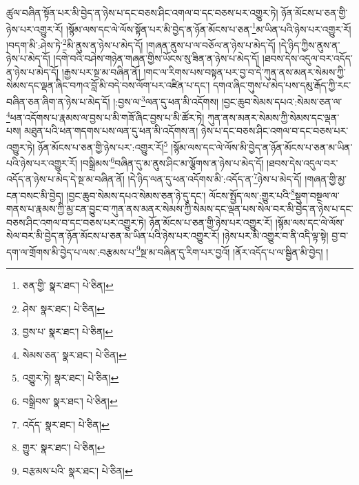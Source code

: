 ཚུལ་བཞིན་སྟོན་པར་མི་བྱེད་ན་ཉེས་པ་དང་བཅས་ཤིང་འགལ་བ་དང་བཅས་པར་འགྱུར་ཏེ། ཉོན་མོངས་པ་ཅན་གྱི་ཉེས་པར་འགྱུར་རོ། །སྙོམ་ལས་དང་ལེ་ལོས་སྟོན་པར་མི་བྱེད་ན་ཉོན་མོངས་པ་ཅན་\footnote{ཅན་གྱི་  སྣར་ཐང་།  པེ་ཅིན། }མ་ཡིན་པའི་ཉེས་པར་འགྱུར་རོ། །བདག་མི་:ཤེས་ཏེ་\footnote{ཤེས་  སྣར་ཐང་།  པེ་ཅིན། }མི་ནུས་ན་ཉེས་པ་མེད་དོ། །གཞན་ནུས་པ་ལ་བཅོལ་ན་ཉེས་པ་མེད་དོ། །དེ་ཉིད་ཀྱིས་ནུས་ན་ཉེས་པ་མེད་དོ། །དགེ་བའི་བཤེས་གཉེན་གཞན་གྱིས་ཡོངས་སུ་ཟིན་ན་ཉེས་པ་མེད་དོ། །ཐབས་དེས་འདུལ་བར་འདོད་ན་ཉེས་པ་མེད་དོ། །རྒྱས་པར་སྔ་མ་བཞིན་ནོ། །གང་ལ་རིགས་པས་བསྟན་པར་བྱ་བ་དེ་ཀུན་ནས་མནར་སེམས་ཀྱི་སེམས་དང་ལྡན་ཞིང་བཀའ་བློ་མི་བདེ་བས་ལོག་པར་འཛིན་པ་དང་། དགའ་ཞིང་གུས་པ་མེད་པས་དམུ་རྒོད་ཀྱི་རང་བཞིན་ཅན་ཞིག་ན་ཉེས་པ་མེད་དོ། །:བྱས་ལ་\footnote{བྱས་པ་  སྣར་ཐང་།  པེ་ཅིན། }ལན་དུ་ཕན་མི་འདོགས། །བྱང་ཆུབ་སེམས་དཔའ་:སེམས་ཅན་ལ་\footnote{སེམས་ཅན་  སྣར་ཐང་།  པེ་ཅིན། }ཕན་འདོགས་པ་རྣམས་ལ་བྱས་པ་མི་གཟོ་ཞིང་བྱས་པ་མི་ཚོར་ཏེ། ཀུན་ནས་མནར་སེམས་ཀྱི་སེམས་དང་ལྡན་པས། མཐུན་པའི་ཕན་གདགས་པས་ལན་དུ་ཕན་མི་འདོགས་ན། ཉེས་པ་དང་བཅས་ཤིང་འགལ་བ་དང་བཅས་པར་འགྱུར་ཏེ། ཉོན་མོངས་པ་ཅན་གྱི་ཉེས་པར་:འགྱུར་རོ།\footnote{འགྱུར་ཏེ།  སྣར་ཐང་།  པེ་ཅིན། } །སྙོམ་ལས་དང་ལེ་ལོས་མི་བྱེད་ན་ཉོན་མོངས་པ་ཅན་མ་ཡིན་པའི་ཉེས་པར་འགྱུར་རོ། །བསྒྲིམས་\footnote{བསྒྲིབས་  སྣར་ཐང་།  པེ་ཅིན། }བཞིན་དུ་མ་ནུས་ཤིང་མ་ལྕོགས་ན་ཉེས་པ་མེད་དོ། །ཐབས་དེས་འདུལ་བར་འདོད་ན་ཉེས་པ་མེད་དེ་སྔ་མ་བཞིན་ནོ། །དེ་ཉིད་ལན་དུ་ཕན་འདོགས་མི་:འདོད་ན་\footnote{འདོད་  སྣར་ཐང་།  པེ་ཅིན། }ཉེས་པ་མེད་དོ། །གཞན་གྱི་མྱ་ངན་བསང་མི་བྱེད། །བྱང་ཆུབ་སེམས་དཔའ་སེམས་ཅན་ཉེ་དུ་དང་། ལོངས་སྤྱོད་ལས་:གྱུར་པའི་\footnote{གྱུར་  སྣར་ཐང་།  པེ་ཅིན། }སྡུག་བསྔལ་ལ་གནས་པ་རྣམས་ཀྱི་མྱ་ངན་བྱུང་བ་ཀུན་ནས་མནར་སེམས་ཀྱི་སེམས་དང་ལྡན་པས་སེལ་བར་མི་བྱེད་ན་ཉེས་པ་དང་བཅས་ཤིང་འགལ་བ་དང་བཅས་པར་འགྱུར་ཏེ། ཉོན་མོངས་པ་ཅན་གྱི་ཉེས་པར་འགྱུར་རོ། །སྙོམ་ལས་དང་ལེ་ལོས་སེལ་བར་མི་བྱེད་ན་ཉོན་མོངས་པ་ཅན་མ་ཡིན་པའི་ཉེས་པར་འགྱུར་རོ། །ཉེས་པར་མི་འགྱུར་བ་ནི་འདི་ལྟ་སྟེ། བྱ་བ་དག་ལ་གྲོགས་མི་བྱེད་པ་ལས་:བརྩམས་པ་\footnote{བརྩམས་པའི་  སྣར་ཐང་།  པེ་ཅིན། }སྔ་མ་བཞིན་དུ་རིག་པར་བྱའོ། །ནོར་འདོད་པ་ལ་སྦྱིན་མི་བྱེད། །
